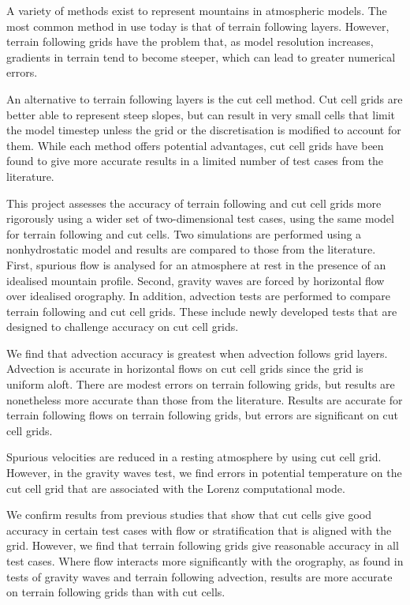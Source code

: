 A variety of methods exist to represent mountains in atmospheric models.  The most common method in use today is that of terrain following layers.  However, terrain following grids have the problem that, as model resolution increases, gradients in terrain tend to become steeper, which can lead to greater numerical errors.

An alternative to terrain following layers is the cut cell method.  Cut cell grids are better able to represent steep slopes, but can result in very small cells that limit the model timestep unless the grid or the discretisation is modified to account for them.
While each method offers potential advantages, cut cell grids have been found to give more accurate results in a limited number of test cases from the literature.

This project assesses the accuracy of terrain following and cut cell grids more rigorously using a wider set of two-dimensional test cases, using the same model for terrain following and cut cells.  Two simulations are performed using a nonhydrostatic model and results are compared to those from the literature.  First, spurious flow is analysed for an atmosphere at rest in the presence of an idealised mountain profile.  Second, gravity waves are forced by horizontal flow over idealised orography.  In addition, advection tests are performed to compare terrain following and cut cell grids.  These include newly developed tests that are designed to challenge accuracy on cut cell grids.

We find that advection accuracy is greatest when advection follows grid layers.  Advection is accurate in horizontal flows on cut cell grids since the grid is uniform aloft.  There are modest errors on terrain following grids, but results are nonetheless more accurate than those from the literature.  Results are accurate for terrain following flows on terrain following grids, but errors are significant on cut cell grids.

Spurious velocities are reduced in a resting atmosphere by using cut cell grid.  However, in the gravity waves test, we find errors in potential temperature on the cut cell grid that are associated with the Lorenz computational mode.

We confirm results from previous studies that show that cut cells give good accuracy in certain test cases with flow or stratification that is aligned with the grid.  However, we find that terrain following grids give reasonable accuracy in all test cases.  Where flow interacts more significantly with the orography, as found in tests of gravity waves and terrain following advection, results are more accurate on terrain following grids than with cut cells.
